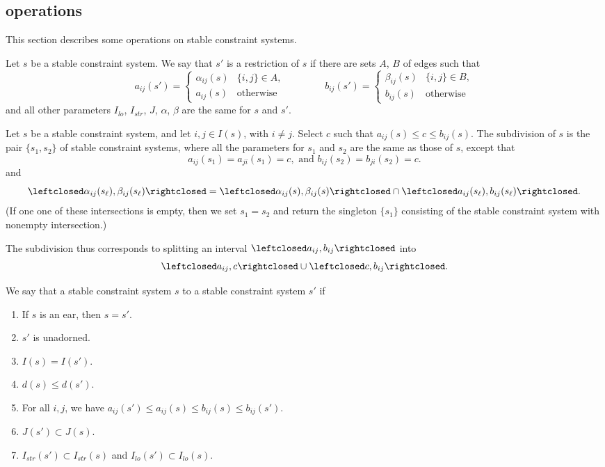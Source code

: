 \subsection{operations}

This section describes some operations on stable constraint
systems.

\begin{definition}[restriction]
Let $s$ be a stable constraint system.
We say that $s'$ is a restriction of $s$ if there are sets $A$, $B$ of
edges such that
\[
a_{ij}(s') = 
\begin{cases}
 \alpha_{ij}(s) & \{i,j\}\in A,\\
  a_{ij}(s) & \text{otherwise}
  \end{cases}
  \qquad\qquad
b_{ij}(s') = 
\begin{cases} \beta_{ij}(s) & \{i,j\}\in B,\\
  b_{ij}(s) & \text{otherwise}
\end{cases}
\]
and all other parameters $I_{lo}$, $I_{str}$, $J$, $\alpha$, $\beta$
are
the same for $s$ and $s'$.
\end{definition}


\begin{definition}[subdivision] 
Let $s$ be a stable constraint system,
and let $i,j\in  I(s)$, with $i\ne j$.  Select $c$ such that $a_{ij}(s)\le c\le b_{ij}(s)$.
The subdivision of $s$ is the pair $\{s_1,s_2\}$ 
of stable constraint systems, where all the parameters for $s_1$ and $s_2$
are the same as those of $s$, except that
\[
a_{ij}(s_1)=a_{ji}(s_1) = c, \text{ and } b_{ij}(s_2) = b_{ji}(s_2)=c.
\]
and
\[
\leftclosed\alpha_{ij}(s_\ell),\beta_{ij}(s_\ell)\rightclosed =
\leftclosed\alpha_{ij}(s),\beta_{ij}(s)\rightclosed\cap
\leftclosed a_{ij}(s_\ell),b_{ij}(s_\ell)\rightclosed.
\]
(If one one of these intersections is empty, then we set $s_1=s_2$ and
return the singleton $\{s_1\}$ consisting of the stable constraint
system with nonempty intersection.)
\end{definition}
The subdivision thus corresponds to splitting an interval 
$\leftclosed a_{ij},b_{ij}\rightclosed$ into
\[
\leftclosed a_{ij},c\rightclosed \cup \leftclosed c,b_{ij}\rightclosed.
\]



\begin{definition}  
We say that a stable constraint system $s$
 to a stable constraint system $s'$ if
\begin{enumerate}
\item If $s$ is an ear, then $s=s'$.
\item $s'$ is unadorned.
\item $I(s) = I(s')$.
\item $d(s)\le d(s')$.
\item For all $i,j$, we have $a_{ij}(s')\le a_{ij}(s)\le b_{ij}(s)\le b_{ij}(s')$.
\item $J(s')\subset J(s)$.
\item $I_{str}(s')\subset I_{str}(s)$  and
$I_{lo}(s')\subset I_{lo}(s)$.
\end{enumerate}
\end{definition}



